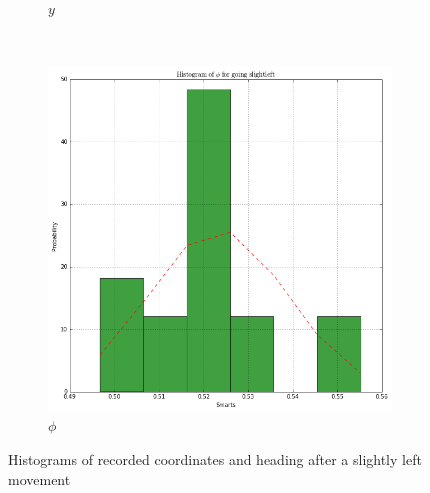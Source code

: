 \documentclass[paper=a4, fontsize=11pt]{scrartcl} %
\begin{document}
\begin{figure}[h!]
\begin{subfigure}[b]{0.3\textwidth}
            \caption{$y$}
        \end{subfigure}
        ~
        \begin{subfigure}[b]{0.3\textwidth}
            \setlength{\fboxsep}{0.5pt} %
            \setlength{\fboxrule}{0.5pt}
            \includegraphics[width=\textwidth,fbox]{images/histogram_2_phi_slightLeft.png}
            \caption{$\phi$}
        \end{subfigure}
        \caption{Histograms of recorded coordinates and heading after a slightly left movement}
    \end{figure}

    \newpage
\end{document}
